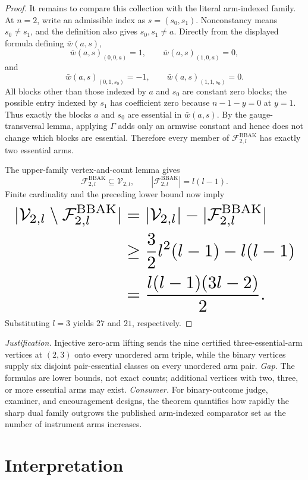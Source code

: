 \documentclass{article}
\begin{document}
\begin{proof}
It remains to compare this collection with the literal arm-indexed family. At \(n=2\), write an admissible index as \(s=(s_0,s_1)\). Nonconstancy means \(s_0\ne s_1\), and the definition also gives \(s_0,s_1\ne a\). Directly from the displayed formula defining \(\bar w(a,s)\),
\[
\bar w(a,s)_{(0,0,a)}=1,\qquad \bar w(a,s)_{(1,0,a)}=0,
\]
and
\[
\bar w(a,s)_{(0,1,s_0)}=-1,\qquad \bar w(a,s)_{(1,1,s_0)}=0.
\]
All blocks other than those indexed by \(a\) and \(s_0\) are constant zero blocks; the possible entry indexed by \(s_1\) has coefficient zero because \(n-1-y=0\) at \(y=1\). Thus exactly the blocks \(a\) and \(s_0\) are essential in \(\bar w(a,s)\). By the gauge-transversal lemma, applying \(\Gamma\) adds only an armwise constant and hence does not change which blocks are essential. Therefore every member of \(\mathcal F^{\mathrm{BBAK}}_{2,l}\) has exactly two essential arms.

The upper-family vertex-and-count lemma gives
\[
\mathcal F^{\mathrm{BBAK}}_{2,l}\subseteq\mathcal V_{2,l},\qquad |\mathcal F^{\mathrm{BBAK}}_{2,l}|=l(l-1).
\]
Finite cardinality and the preceding lower bound now imply
\[
\makebox[\linewidth][c]{\resizebox{0.98\linewidth}{!}{\(\displaystyle \begin{aligned}
|\mathcal V_{2,l}\setminus\mathcal F^{\mathrm{BBAK}}_{2,l}|
&=|\mathcal V_{2,l}|-|\mathcal F^{\mathrm{BBAK}}_{2,l}|\\
&\ge\frac32l^2(l-1)-l(l-1)\\
&=\frac{l(l-1)(3l-2)}2.
\end{aligned}\)}}
\]
Substituting \(l=3\) yields \(27\) and \(21\), respectively.
\end{proof}
\par\smallskip\noindent \textit{Justification.} Injective zero-arm lifting sends the nine certified three-essential-arm vertices at \((2,3)\) onto every unordered arm triple, while the binary vertices supply six disjoint pair-essential classes on every unordered arm pair. \textit{Gap.} The formulas are lower bounds, not exact counts; additional vertices with two, three, or more essential arms may exist. \textit{Consumer.} For binary-outcome judge, examiner, and encouragement designs, the theorem quantifies how rapidly the sharp dual family outgrows the published arm-indexed comparator set as the number of instrument arms increases.

\section{Interpretation}
\end{document}
